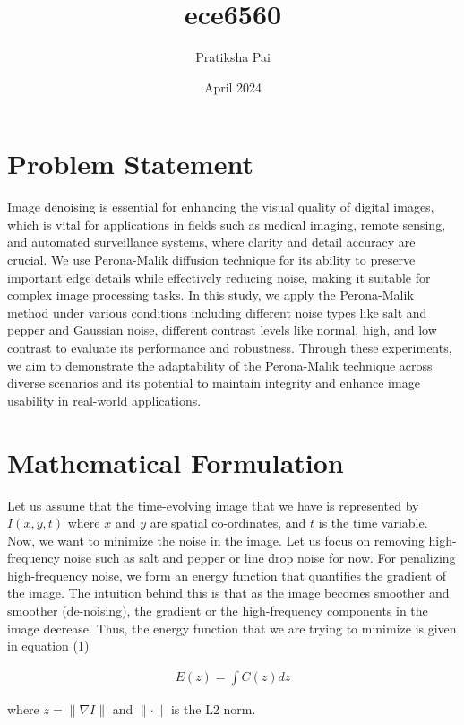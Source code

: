 \documentclass{article}
\title{ece6560}
\author{Pratiksha Pai}
\date{April 2024}
\begin{document}
\maketitle

\section{Problem Statement}

Image denoising is essential for enhancing the visual quality of digital images, which is vital for applications in fields such as medical imaging, remote sensing, and automated surveillance systems, where clarity and detail accuracy are crucial. We use Perona-Malik diffusion technique for its ability to preserve important edge details while effectively reducing noise, making it suitable for complex image processing tasks. In this study, we apply the Perona-Malik method under various conditions including different noise types like salt and pepper and Gaussian noise, different contrast levels like normal, high, and low contrast to evaluate its performance and robustness. Through these experiments, we aim to demonstrate the adaptability of the Perona-Malik technique across diverse scenarios and its potential to maintain integrity and enhance image usability in real-world applications.

\section{Mathematical Formulation}

Let us assume that the time-evolving image that we have is represented by \( I(x,y,t) \) where \( x \) and \( y \) are spatial co-ordinates, and \( t \) is the time variable. Now, we want to minimize the noise in the image. Let us focus on removing high-frequency noise such as salt and pepper or line drop noise for now. For penalizing high-frequency noise, we form an energy function that quantifies the gradient of the image. The intuition behind this is that as the image becomes smoother and smoother (de-noising), the gradient or the high-frequency components in the image decrease. Thus, the energy function that we are trying to minimize is given in equation (1)

\begin{align}
E(z) = \int C(z)dz
\end{align}

where \( z = \|\nabla I\| \) and \(\|\cdot\|\) is the L2 norm.
\end{document}
